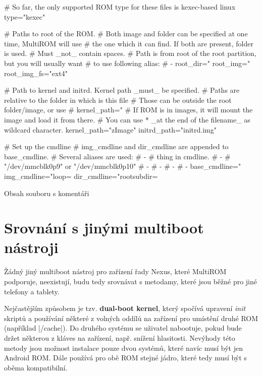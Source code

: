 \documentclass[12pt, a4paper, oneside]{article}
\newcommand{\B}{\textbf} %
\newcommand{\It}{\textit}  %
\begin{document}
\linespread{1.1}
\begin{listing}[H]
\begin{inicode}
# So far, the only supported ROM type for these files is kexec-based linux
type="kexec"

# Paths to root of the ROM.
# Both image and folder can be specified at one time, MultiROM will use 
# the one which it can find. If both are present, folder is used.
# Must _not_ contain spaces.
# Path is from root of the root partition, but you will usually want
# to use following alias:
# - %
root_dir="%
root_img="%
root_img_fs="ext4"

# Path to kernel and initrd. Kernel path _must_ be specified.
# Paths are relative to the folder in which is this file
# Those can be outside the root folder/image, or use %
# kernel_path="%
# If ROM is in images, it will mount the image and load it from there.
# You can use  * _at the end of the filename_ as wildcard character.
kernel_path="zImage"
initrd_path="initrd.img"

# Set up the cmdline
# img_cmdline and dir_cmdline are appended to base_cmdline.
# Several aliases are used:
#  - %
#         thing in cmdline.
#  - %
#         "/dev/mmcblk0p9" or "/dev/mmcblk0p10"
#  - %
#  - %
#  - %
#  - %
base_cmdline="%
img_cmdline="loop=%
dir_cmdline="rootsubdir=%
\end{inicode}
\caption{Obsah souboru  s komentáři}
\label{rom-info}
\end{listing}

\linespread{1.3}

\section{Srovnání s jinými multiboot nástroji}
Žádný jiný multiboot nástroj pro zařízení řady Nexus, které MultiROM podporuje, neexistují, budu tedy srovnávat s metodamy, které jsou běžné pro jiné telefony a tablety.

Nejčastějším způsobem je tzv. \B{dual-boot kernel}, který spočívá upravení \It{init} skriptů a používání některé z volných oddílů na zařízení pro umístění druhé ROM (například |/cache|). Do druhého systému se uživatel nabootuje, pokud bude držet některou z kláves na zařízení, např. snížení hlasitosti. Nevýhody této metody jsou možnost instalace pouze dvou systémů, které navíc musí být jen Android ROM. Dále používá pro obě ROM stejné jádro, které tedy musí být s oběma kompatibilní.
\end{document}
